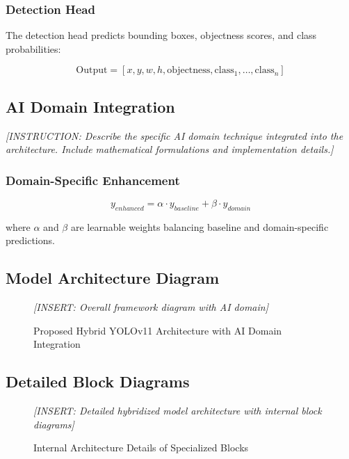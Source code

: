 \documentclass[11pt,a4paper]{article}
\begin{document}
\subsubsection{Detection Head}

The detection head predicts bounding boxes, objectness scores, and class probabilities:

\begin{equation}
\text{Output} = [x, y, w, h, \text{objectness}, \text{class}_1, \ldots, \text{class}_n]
\end{equation}

\subsection{AI Domain Integration}

\textit{[INSTRUCTION: Describe the specific AI domain technique integrated into the architecture. 
Include mathematical formulations and implementation details.]}

\subsubsection{Domain-Specific Enhancement}

\begin{equation}
y_{enhanced} = \alpha \cdot y_{baseline} + \beta \cdot y_{domain}
\end{equation}

where $\alpha$ and $\beta$ are learnable weights balancing baseline and domain-specific predictions.

\subsection{Model Architecture Diagram}

\begin{figure}[H]
    \centering
    \textit{[INSERT: Overall framework diagram with AI domain]}
    \caption{Proposed Hybrid YOLOv11 Architecture with AI Domain Integration}
    \label{fig:proposed_arch}
\end{figure}

\subsection{Detailed Block Diagrams}

\begin{figure}[H]
    \centering
    \textit{[INSERT: Detailed hybridized model architecture with internal block diagrams]}
    \caption{Internal Architecture Details of Specialized Blocks}
    \label{fig:detailed_blocks}
\end{figure}
\end{document}
